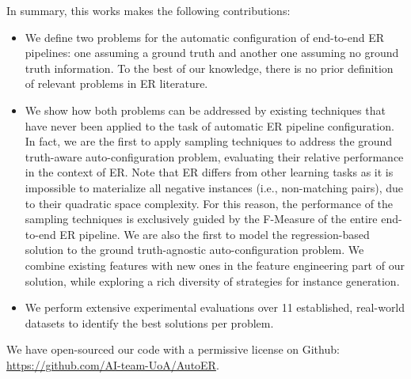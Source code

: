 In summary, this works makes the following contributions:
\begin{itemize}[leftmargin=*]
    \item We define two problems for the automatic configuration of end-to-end ER pipelines: one assuming a ground truth and another one assuming no ground truth information. {To the best of our knowledge, there is no prior definition of relevant problems in ER literature.}
    \item We show how both problems can be addressed by existing techniques that have never been applied to the task of automatic ER pipeline configuration. {In fact, we are the first to apply sampling techniques to address the ground truth-aware auto-configuration problem, evaluating their relative performance in the context of ER. Note that ER differs from other learning tasks as it is impossible to materialize all negative instances (i.e., non-matching pairs), due to their quadratic space complexity. For this reason, the performance of the sampling techniques is exclusively guided by the F-Measure of the entire end-to-end ER pipeline. We are also the first to 
    model the regression-based solution to the ground truth-agnostic auto-configuration problem. We combine existing features with new ones in the feature engineering part of our solution, while exploring a rich diversity of strategies for instance generation. }
    \item We perform extensive experimental evaluations over 11 established, real-world datasets 
    to identify the best solutions per problem.
\end{itemize}

We have open-sourced our code with a permissive license on Github: \underline{https://github.com/AI-team-UoA/AutoER}.
